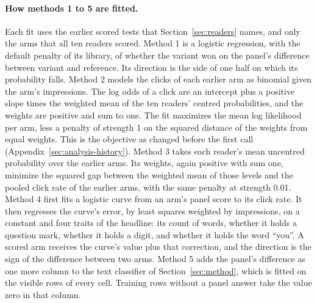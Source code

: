 \paragraph{How methods 1 to 5 are fitted.} Each fit uses the earlier scored tests that Section~\ref{sec:readers} names, and only the arms that all ten readers scored. Method 1 is a logistic regression, with the default penalty of its library, of whether the variant won on the panel's difference between variant and reference. Its direction is the side of one half on which its probability falls. Method 2 models the clicks of each earlier arm as binomial given the arm's impressions. The log odds of a click are an intercept plus a positive slope times the weighted mean of the ten readers' centred probabilities, and the weights are positive and sum to one. The fit maximizes the mean log likelihood per arm, less a penalty of strength 1 on the squared distance of the weights from equal weights. This is the objective as changed before the first call (Appendix~\ref{sec:analysis-history}). Method 3 takes each reader's mean uncentred probability over the earlier arms. Its weights, again positive with sum one, minimize the squared gap between the weighted mean of those levels and the pooled click rate of the earlier arms, with the same penalty at strength 0.01. Method 4 first fits a logistic curve from an arm's panel score to its click rate. It then regresses the curve's error, by least squares weighted by impressions, on a constant and four traits of the headline: its count of words, whether it holds a question mark, whether it holds a digit, and whether it holds the word ``you''. A scored arm receives the curve's value plus that correction, and the direction is the sign of the difference between two arms. Method 5 adds the panel's difference as one more column to the text classifier of Section~\ref{sec:method}, which is fitted on the visible rows of every cell. Training rows without a panel answer take the value zero in that column.

